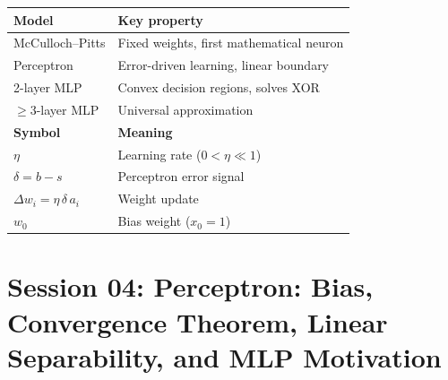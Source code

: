 \documentclass[12pt,a4paper]{article}
\begin{document}
\vspace{1em}
\begin{tcolorbox}[colback=gray!5, colframe=gray!50!black,
  title={\bfseries Session 03 -- Quick Reference Card}]
\begin{center}
\begin{tabular}{ll}
\toprule
\textbf{Model} & \textbf{Key property} \\
\midrule
McCulloch--Pitts & Fixed weights, first mathematical neuron \\
Perceptron & Error-driven learning, linear boundary \\
2-layer MLP & Convex decision regions, solves XOR \\
$\geq$3-layer MLP & Universal approximation \\
\midrule
\textbf{Symbol} & \textbf{Meaning} \\
\midrule
$\eta$ & Learning rate ($0 < \eta \ll 1$) \\
$\delta = b - s$ & Perceptron error signal \\
$\Delta w_i = \eta\,\delta\,a_i$ & Weight update \\
$w_0$ & Bias weight ($x_0 = 1$) \\
\bottomrule
\end{tabular}
\end{center}
\end{tcolorbox}


\clearpage

\part{Session 04: Perceptron: Bias, Convergence Theorem, Linear Separability, and MLP Motivation}
\end{document}
